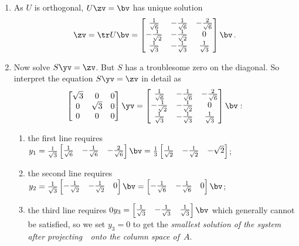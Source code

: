\begin{example}
\begin{solution}
\begin{enumerate}
\item As \(U\) is orthogonal, \(U\zv=\bv\) has unique solution 
\begin{equation*}
\zv=\tr U\bv=\begin{bmatrix} \frac1{\sqrt6}&-\frac1{\sqrt6}&-\frac2{\sqrt6}
\\-\frac1{\sqrt2}&-\frac1{\sqrt2}&0
\\\frac1{\sqrt3}&-\frac1{\sqrt3}&\frac1{\sqrt3} \end{bmatrix}\bv
\,.
\end{equation*}


\item Now solve \(S\yv=\zv\).
But \(S\) has a troublesome zero on the diagonal. 
So interpret the equation \(S\yv=\zv\) in detail as
\begin{equation*}
\begin{bmatrix} \sqrt3&0&0
\\0&\sqrt3&0
\\0&0&0 \end{bmatrix}\yv=\begin{bmatrix} \frac1{\sqrt6}&-\frac1{\sqrt6}&-\frac2{\sqrt6}
\\-\frac1{\sqrt2}&-\frac1{\sqrt2}&0
\\\frac1{\sqrt3}&-\frac1{\sqrt3}&\frac1{\sqrt3} \end{bmatrix}\bv:
\end{equation*}
\begin{enumerate}
\item the first line requires \(y_1=\frac1{\sqrt3}\begin{bmatrix} \frac1{\sqrt6}&-\frac1{\sqrt6}&-\frac2{\sqrt6} \end{bmatrix}\bv
=\frac13\begin{bmatrix} \frac1{\sqrt2}&-\frac1{\sqrt2}&-\sqrt2 \end{bmatrix}\);
\item the second line requires \(y_2=\frac1{\sqrt3}\begin{bmatrix} -\frac1{\sqrt2}&-\frac1{\sqrt2}&0\end{bmatrix}\bv
=\begin{bmatrix} -\frac1{\sqrt6}&-\frac1{\sqrt6}&0\end{bmatrix}\bv\);
\item the third line requires \(0y_3=\begin{bmatrix} \frac1{\sqrt3}&-\frac1{\sqrt3}&\frac1{\sqrt3} \end{bmatrix}\bv\) which generally cannot be satisfied, so we set \(y_3=0\) to get the \emph{smallest solution of the system after projecting~\bv\ onto the column space of~\(A\)}.
\end{enumerate}


\end{enumerate}
\end{solution}
\end{example}
